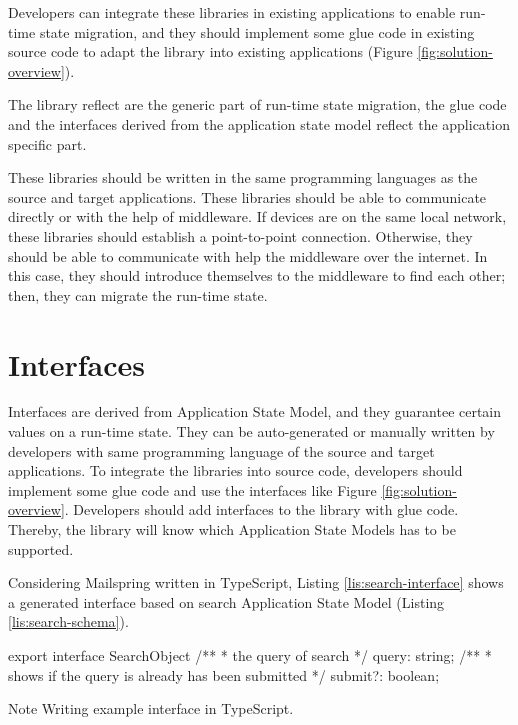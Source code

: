 Developers can integrate these libraries in existing applications to enable run-time state migration, and they should implement some glue code in existing source code to adapt the library into existing applications (Figure \ref{fig:solution-overview}).

The library reflect are the generic part of run-time state migration, the glue code and the interfaces derived from the application state model reflect the application specific part.

These libraries should be written in the same programming languages as the source and target applications. These libraries should be able to communicate directly or with the help of middleware.
If devices are on the same local network, these libraries should establish a point-to-point connection.
Otherwise, they should be able to communicate with help the middleware over the internet.
In this case, they should introduce themselves to the middleware to find each other; then, they can migrate the run-time state.


\section{Interfaces}
Interfaces are derived from Application State Model, and they guarantee certain values on a run-time state. They can be auto-generated or manually written by developers with same programming language of the source and target applications.
To integrate the libraries into source code, developers should implement some glue code and use the interfaces like Figure \ref{fig:solution-overview}. Developers should add interfaces to the library with glue code. Thereby, the library will know which Application State Models has to be supported.

Considering Mailspring written in TypeScript, Listing \ref{lis:search-interface} shows a generated interface based on search Application State Model (Listing \ref{lis:search-schema}).

\FloatBarrier
\begin{code}
\begin{js}
export interface SearchObject {
    /**
     * the query of search
     */
    query: string;
    /**
     * shows if the query is already has been submitted
     */
    submit?: boolean;
}
\end{js}
\caption{Note Writing example interface in TypeScript.}
\label{lis:search-interface}
\end{code}
\FloatBarrier


